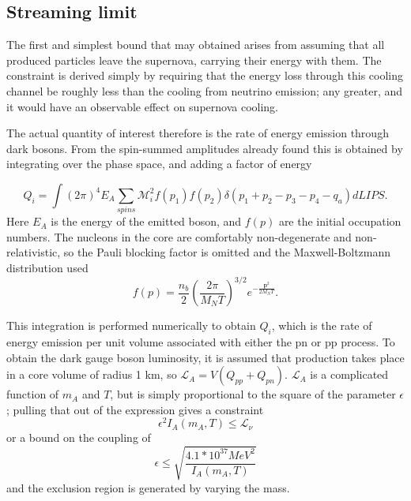 \documentclass[nofootinbib,aps,prd,preprint,superscriptaddress]{revtex4}
\newcommand{\beq}{\begin{equation}}
\newcommand{\eeq}{\end{equation}}
\begin{document}
\subsection{Streaming limit}
The first and simplest bound that may obtained arises from assuming that all produced particles leave the supernova, carrying their energy with them. The constraint is derived simply by requiring that the energy loss through this cooling channel be roughly less than the cooling from neutrino emission; any greater, and it would have an observable effect on supernova cooling.

The actual quantity of interest therefore is the rate of energy emission through dark bosons. From the spin-summed amplitudes already found this is obtained by integrating over the phase space, and adding a factor of energy

\beq
Q_i = \int (2\pi)^4 E_A \sum_{spins} \mathcal{M}^2_i f(p_1) f(p_2)\delta(p_1+p_2-p_3-p_4-q_a) dLIPS.
\eeq
Here $ E_A $ is the energy of the emitted boson, and $ f(p) $ are the initial occupation numbers. The nucleons in the core are comfortably non-degenerate and non-relativistic, so  the Pauli blocking factor is omitted and the Maxwell-Boltzmann distribution used  
\beq
	f(p) =  \frac{n_b}{2} (\frac{2 \pi}{M_N T})^{3/2} e^{-\frac{\textbf{p}^2} {2 M_N T}}.
\eeq
	
This integration is performed numerically to obtain $ Q_i $, which is the rate of energy emission per unit volume associated with either the pn or pp process. To obtain the dark gauge boson luminosity, it is assumed that production takes place in a core volume of radius 1 km, so $ \mathcal{L}_A = V(Q_{pp} + Q_{pn}) $. $ \mathcal{L}_A $ is a complicated function of $ m_A $ and $ T $, but is simply proportional to the square of the parameter $ \epsilon $; pulling that out of the expression gives a constraint 
\beq
\epsilon^2 I_A(m_A, T) \le \mathcal{L}_\nu
\eeq
or a bound on the coupling of 
\beq 
\epsilon \le \sqrt{\frac{4.1 * 10^{37} MeV^2}{I_A(m_A, T)}} 
\eeq 
and the exclusion region is generated by varying the mass. 
\end{document}
